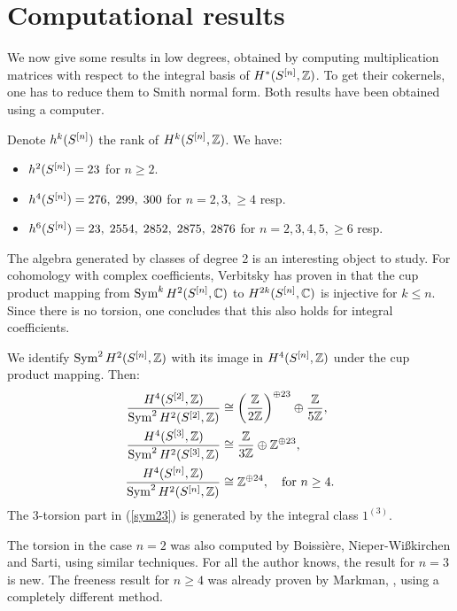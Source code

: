 \section{Computational results} \label{CompSection}
We now give some results in low degrees, obtained by computing multiplication matrices with respect to the integral basis of $H^*(S^{[n]},\mathbb{Z})$. To get their cokernels, one has to reduce them to Smith normal form. Both results have been obtained using a computer.
\begin{remark}
Denote $h^k(S^{[n]})$ the rank of $H^k(S^{[n]},\mathbb{Z})$. We have:
\begin{itemize}
\item $h^2(S^{[n]}) = 23 $ for $n\geq 2$.
\item $h^4(S^{[n]}) = 276,\; 299,\; 300$ for $n=2,3, \geq 4$ resp.
\item $h^6(S^{[n]}) = 23,\; 2554,\; 2852,\; 2875,\; 2876$ for $n=2,3,4,5,\geq6$ resp.
\end{itemize}
\end{remark}
The algebra generated by classes of degree 2 is an interesting object to study. For cohomology with complex coefficients, Verbitsky has proven in \cite{Verbitsky} that the cup product mapping from $\operatorname{Sym}^k H^2(S^{[n]},\mathbb{C})$ to $H^{2k}(S^{[n]},\mathbb{C})$ is injective for $k\leq n$. Since there is no torsion, one concludes that this also holds for integral coefficients.
\begin{proposition} We identify $\operatorname{Sym}^2H^2(S^{[n]},\mathbb{Z})$ with its image in $H^4(S^{[n]},\mathbb{Z})$ under the cup product mapping. Then: 
\label{p22}
\begin{align}
\frac{H^4(S^{[2]},\mathbb{Z})}{\operatorname{Sym}^2 H^2(S^{[2]},\mathbb{Z})} & \cong \left(\frac{\mathbb{Z}}{2\mathbb{Z}}\right)^{\oplus 23} \oplus \frac{\mathbb{Z}}{5\mathbb{Z}},\\
\label{sym23}
\frac{H^4(S^{[3]},\mathbb{Z})}{\operatorname{Sym}^2 H^2(S^{[3]},\mathbb{Z})} & \cong \frac{\mathbb{Z}}{3\mathbb{Z}} \oplus \mathbb{Z}^ {\oplus 23}, \\
\frac{H^4(S^{[n]},\mathbb{Z})}{\operatorname{Sym}^2 H^2(S^{[n]},\mathbb{Z})} & \cong  \mathbb{Z}^ {\oplus 24}, \quad \text{for }n\geq 4.
\end{align}
The 3-torsion part in (\ref{sym23}) is generated by the integral class $1^{(3)}$.
\end{proposition}
\begin{remark}
The torsion in the case $n=2$ was also computed by Boissi\`{e}re, Nieper-Wi\ss kirchen and Sarti, \cite[Prop. 3]{BNS} using similar techniques.
For all the author knows, the result for $n=3$ is new.
The freeness result for $n\geq 4$ was already proven by Markman, \cite[Thm. 1.10]{Markman2}, using a completely different method. 
\end{remark}
